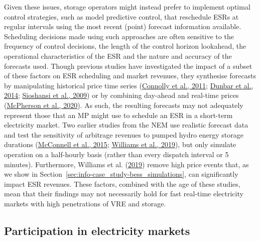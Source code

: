 \documentclass[12pt,a4paper,]{report}
\begin{document}
Given these issues, storage operators might instead prefer to implement
optimal control strategies, such as model predictive control, that
reschedule ESRs at regular intervals using the most recent (point)
forecast information available. Scheduling decisions made using such
approaches are often sensitive to the frequency of control decisions,
the length of the control horizon lookahead, the operational
characteristics of the ESR and the nature and accuracy of the forecasts
used. Though previous studies have investigated the impact of a subset
of these factors on ESR scheduling and market revenues, they synthesise
forecasts by manipulating historical price time series
(\protect\hyperlink{ref-connollyPracticalOperationStrategies2011}{Connolly
et al., 2011};
\protect\hyperlink{ref-dunbarImpactElectricityPrice2014}{Dunbar et al.,
2014};
\protect\hyperlink{ref-sioshansiEstimatingValueElectricity2009}{Sioshansi
et al., 2009}) or by combining day-ahead and real-time prices
(\protect\hyperlink{ref-mcphersonImpactsStorageDispatch2020}{McPherson
et al., 2020}). As such, the resulting forecasts may not adequately
represent those that an MP might use to schedule an ESR in a short-term
electricity market. Two earlier studies from the NEM use realistic
forecast data and test the sensitivity of arbitrage revenues to pumped
hydro energy storage durations
(\protect\hyperlink{ref-mcconnellEstimatingValueElectricity2015}{McConnell
et al., 2015};
\protect\hyperlink{ref-williamsBatteryNationOperation2019}{Williams et
al., 2019}), but only simulate operation on a half-hourly basis (rather
than every dispatch interval or 5 minutes). Furthermore, Williams et al.
(\protect\hyperlink{ref-williamsBatteryNationOperation2019}{2019})
remove high price events that, as we show in
Section~\ref{sec:info-case_study-bess_simulations}, can significantly
impact ESR revenues. These factors, combined with the age of these
studies, mean that their findings may not necessarily hold for fast
real-time electricity markets with high penetrations of VRE and storage.

\hypertarget{sec:info-context-esr-market_participation}{%
\subsection{Participation in electricity
markets}\label{sec:info-context-esr-market_participation}}
\end{document}
